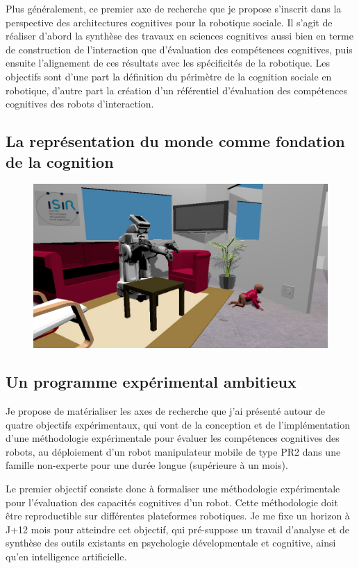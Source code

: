\documentclass[a4paper]{article}
\begin{document}
Plus généralement, ce premier axe de recherche que je propose s'inscrit dans la
perspective des architectures cognitives pour la robotique sociale. Il s'agit de
réaliser d'abord la synthèse des travaux en sciences cognitives aussi bien en
terme de construction de l'interaction que d'évaluation des compétences
cognitives, puis ensuite l'alignement de ces résultats avec les spécificités de
la robotique. Les objectifs sont d'une part la définition du périmètre de la
cognition sociale en robotique, d'autre part la création d'un référentiel
d'évaluation des compétences cognitives des robots d'interaction.


\subsection{La représentation du monde comme fondation de la cognition}

\begin{figure}
\includegraphics[width=\textwidth]{figs/robots_home_baby_socket.jpg}
\label{babyplug}
\end{figure}

\subsection{Un programme expérimental ambitieux}

Je propose de matérialiser les axes de recherche que j'ai présenté autour de
quatre objectifs expérimentaux, qui vont de la conception et de
l'implémentation d'une méthodologie expérimentale pour évaluer les compétences
cognitives des robots, au déploiement d'un robot manipulateur mobile de type
PR2 dans une famille non-experte pour une durée longue (supérieure à un mois).

Le premier objectif consiste donc à formaliser une méthodologie expérimentale
pour l'évaluation des capacités cognitives d'un robot. Cette méthodologie doit
être reproductible sur différentes plateformes robotiques. Je me fixe un horizon
à J+12 mois pour atteindre cet objectif, qui pré-suppose un travail d'analyse et de
synthèse des outils existants en psychologie dévelopmentale et cognitive, ainsi
qu'en intelligence artificielle.
\end{document}
